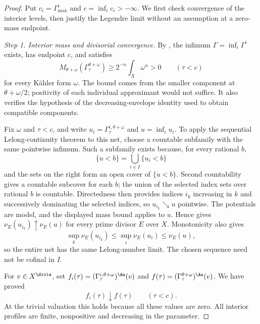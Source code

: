 \begin{proof}
Put $c_i=\Gamma^i_{\max}$ and $c=\inf_i c_i> -\infty$.
We first check convergence of the interior levels, then justify
the Legendre limit without an assumption at a zero-mass endpoint.

\emph{Step 1. Interior mass and divisorial convergence.}
By , the infimum
$\Gamma=\inf_i\Gamma^i$ exists, has endpoint $c$, and satisfies
\[
 M_{\theta+\omega}(\Gamma_\tau^{\theta+\omega})
       \geq 2^{-n}\int_X\omega^n>0
                  \qquad(\tau<c)
\]
for every K\"ahler form $\omega$.
The bound comes from the smaller component at $\theta+\omega/2$;
positivity of each individual approximant would not suffice.
It also verifies the hypothesis of the decreasing-envelope
identity \cite[Proposition~2.8]{XiaOperationsV3} used to obtain
compatible components.

Fix $\omega$ and $\tau<c$, and write
$u_i=\Gamma_\tau^{i,\theta+\omega}$ and $u=\inf_i u_i$.
To apply the sequential Lelong-continuity theorem to this net,
choose a countable subfamily with the same pointwise infimum.
Such a subfamily exists because, for every rational $b$,
\[
             \{u<b\}=\bigcup_{i\in I}\{u_i<b\}
\]
and the sets on the right form an open cover of $\{u<b\}$.
Second countability gives a countable subcover for each $b$;
the union of the selected index sets over rational $b$ is countable.
Directedness then provides indices $i_k$ increasing in $k$
and successively dominating the selected indices, so
$u_{i_k}\searrow u$ pointwise.
The potentials are model, and the displayed mass bound applies
to $u$. Hence \cite[Lemma~2.1]{DXZ23} gives
$\nu_E(u_{i_k})\uparrow\nu_E(u)$ for every prime divisor $E$
over $X$. Monotonicity also gives
\[
 \sup_k\nu_E(u_{i_k})\leq\sup_i\nu_E(u_i)\leq\nu_E(u),
\]
so the entire net has the same Lelong-number limit.
The chosen sequence need not be cofinal in $I$.

For $v\in X^{\divis}$, set
$f_i(\tau)=(\Gamma_\tau^{i,\theta+\omega})^{\An}(v)$
and $f(\tau)=(\Gamma_\tau^{\theta+\omega})^{\An}(v)$.
We have proved
\[
                   f_i(\tau)\downarrow f(\tau)
                            \qquad(\tau<c).
\tag{57.12a}\label{eq:comp-net-interior-convergence}
\]
At the trivial valuation this holds because all these values
are zero. All interior profiles are finite, nonpositive and
decreasing in the parameter.


\end{proof}
